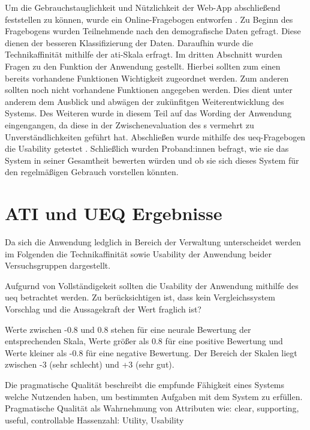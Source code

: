 Um die Gebrauchstauglichkeit und Nützlichkeit der Web-App abschließend feststellen zu können, wurde
ein Online-Fragebogen entworfen . Zu Beginn des Fragebogens wurden
Teilnehmende nach den demografische Daten gefragt. Diese dienen der besseren Klassifizierung der
Daten. Daraufhin wurde die Technikaffinität mithilfe der \ac{ati}-Skala erfragt. Im dritten
Abschnitt wurden Fragen zu den Funktion der Anwendung gestellt. Hierbei sollten zum einen bereits
vorhandene Funktionen Wichtigkeit zugeordnet werden. Zum anderen sollten noch nicht vorhandene
Funktionen angegeben werden. Dies dient unter anderem dem Ausblick und abwägen der zukünfitgen
Weiterentwicklung des Systems. Des Weiteren wurde in diesem Teil auf das Wording der Anwendung
eingengangen, da diese in der Zwischenevaluation des s vermehrt zu
Unverständlichkeiten geführt hat. Abschließen wurde mithilfe des \ac{ueq}-Fragebogen die Usability
getestet \cite{burghardt_mensch_2018}. Schließlich wurden Proband:innen befragt, wie sie das System
in seiner Gesamtheit bewerten würden und ob sie sich dieses System für den regelmäßigen Gebrauch
vorstellen könnten.



\section{ATI und UEQ Ergebnisse}
Da sich die Anwendung ledglich in Bereich der Verwaltung unterscheidet werden im Folgenden die
Technikaffinität sowie Usability der Anwendung beider Versuchsgruppen dargestellt.

Aufgurnd von Vollständigekeit sollten die Usability der Anwendung mithilfe des \ac{ueq} betrachtet
werden. Zu berücksichtigen ist, dass kein Vergleichssystem Vorschlag und die Aussagekraft der Wert
fraglich ist?

Werte zwischen -0.8 und 0.8 stehen für eine neurale Bewertung der entsprechenden Skala, Werte größer
als 0.8 für eine positive Bewertung und Werte kleiner als -0.8 für eine negative Bewertung. Der
Bereich der Skalen liegt zwischen -3 (sehr schlecht) und +3 (sehr gut). 


Die pragmatische Qualität beschreibt die empfunde Fähigkeit eines Systems welche Nutzenden haben, um
bestimmten Aufgaben mit dem System zu erfüllen. Pragmatische Qualität als Wahrnehmung von Attributen
wie: clear, supporting, useful, controllable Hassenzahl: Utility, Usability
\cite{hassenzahl_thing_2004}

